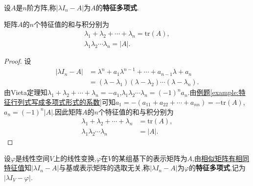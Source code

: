 \documentclass[../../main.tex]{subfiles}%
\begin{document}
\begin{definition}[特征多项式]
设$A$是$n$阶方阵,称$|\lambda I_n - A|$为$A$的\textbf{特征多项式}.
\end{definition}

\begin{theorem}[特征值的和与积]\label{theorem:特征值的和与积}
矩阵$A$的$n$个特征值的和与积分别为
\begin{gather*}
\lambda_1 + \lambda_2 + \cdots + \lambda_n = \mathrm{tr}(A), \\
\lambda_1 \lambda_2 \cdots \lambda_n = |A|.
\end{gather*}
\end{theorem}
\begin{proof}
设
\begin{align*}
|\lambda I_n - A| &= \lambda^n + a_1 \lambda^{n-1} + \cdots + a_{n-1} \lambda + a_n \\
&= (\lambda - \lambda_1)(\lambda - \lambda_2) \cdots (\lambda - \lambda_n).
\end{align*}
由Vieta定理知$\lambda_1 + \lambda_2 + \cdots + \lambda_n = -a_1$,$\lambda_1 \lambda_2 \cdots \lambda_n = (-1)^n a_n$.由\hyperref[example:特征行列式写成多项式形式的系数]{例题\ref{example:特征行列式写成多项式形式的系数}}可知$a_1 = -(a_{11} + a_{22} + \cdots + a_{nn}) = -\mathrm{tr}(A)$,$a_n = (-1)^n |A|$.因此矩阵$A$的$n$个特征值的和与积分别为
\begin{align*}
\lambda_1 + \lambda_2 + \cdots + \lambda_n &= \mathrm{tr}(A), \\
\lambda_1 \lambda_2 \cdots \lambda_n &= |A|.
\end{align*}
\end{proof}

\begin{definition}[特征多项式]
设$\varphi$是线性空间$V$上的线性变换,$\varphi$在$V$的某组基下的表示矩阵为$A$,由\hyperref[theorem:相似矩阵有相同特征值]{相似矩阵有相同特征值}知$|\lambda I_n - A|$与基或表示矩阵的选取无关,称$|\lambda I_n - A|$为$\varphi$的\textbf{特征多项式},记为$|\lambda I_V - \varphi|$.
\end{definition}
\end{document}
